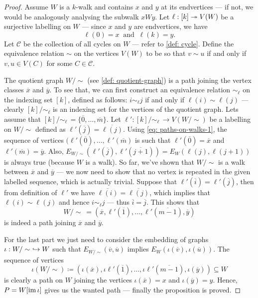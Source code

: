 \begin{proof}
  Assume \(W\) is a \(k\)-walk and contains \(x\) and \(y\) at its endvertices
  --- if not, we would be analogously analysing the subwalk \(xWy\). Let \(\ell:
  [k] \twoheadrightarrow V(W)\) be a surjective labelling on \(W\) --- since \(x\) and \(y\)
  are endvertices, we have
  \begin{equation}\label{eq: paths-on-walks-1}
    \ell(0) = x\ \text{ and }\ \ell(k) = y.
  \end{equation}
  Let \(\mathcal C\) be the
  collection of all cycles on \(W\) --- refer to \cref{def: cycle}. Define the
  equivalence relation \(\sim\) on the vertices \(V(W)\) to be so that \(v \sim
  u\) if and only if \(v, u \in V(C)\) for some \(C \in \mathcal C\).

  The quotient graph \(W/\sim\) (see \cref{def: quotient-graph}) is a path
  joining the vertex classes \(\overline x\) and \(\overline y\). To see that,
  we can first construct an equivalence relation \(\sim_\ell\) on the indexing
  set \([k]\), defined as follows: \(i \sim_\ell j\) if and only if \(\ell(i)
  \sim \ell(j)\) --- clearly \([k]/\sim_\ell\) is an indexing set for the
  vertices of the quotient graph. Lets assume that \([k]/\sim_\ell\, =
  \{\overline 0, \dots, \overline m\}\). Let \(\ell': [k]/\sim_\ell\, \to
  V(W/\sim)\) be a labelling on \(W/\sim\) defined as \(\ell'(\overline j) =
  \overline{\ell(j)}\). Using \cref{eq: paths-on-walks-1}, the sequence of
  vertices \((\ell'(\overline 0), \dots, \ell'(\overline m)\) is such that
  \(\ell'(\overline 0) = \overline x\) and \(\ell'(\overline m) = \overline y\).
  Also, \(E_{W/\sim}(\ell'(\overline j), \ell'(\overline{j + 1})) = E_W(\ell(j),
  \ell(j+1))\) is always true (because \(W\) is a walk). So far, we've shown
  that \(W/\sim\) is a walk between \(\overline x\) and \(\overline y\) --- we
  now need to show that no vertex is repeated in the given labelled sequence,
  which is actually trivial. Suppose that \(\ell'(\overline i) = \ell'(\overline
  j)\), then from definition of \(\ell'\) we have \(\overline{\ell(i)} =
  \overline{\ell(j)}\), which implies that \(\ell(i) \sim \ell(j)\) and hence
  \(i \sim_\ell j\) --- thus \(\overline i = \overline j\). This shows that
  \[
    W/\sim\ = (\overline x, \ell'(\overline 1), \dots, \ell'(\overline{m - 1}),
    \overline y)
  \]
  is indeed a path joining \(\overline x\) and \(\overline y\).

  For the last part we just need to consider the embedding of graphs \(\iota:
  W/\sim\ \hookrightarrow W\) such that \(E_{W/\sim}(\overline v, \overline u)\) implies
  \(E_W(\iota(\overline v), \iota(\overline u))\). The sequence of vertices
  \[
    \iota(W/\sim) \coloneqq (\iota(\overline x), \iota\ell'(\overline 1), \dots,
    \iota \ell'(\overline{m-1}), \iota(\overline y)) \subseteq W
  \]
  is clearly a path on \(W\) joining the vertices \(\iota(\overline x) = x\) and
  \(\iota(\overline y) = y\). Hence, \(P = W[\operatorname{im} \iota]\) gives us the wanted
  path --- finally the proposition is proved.
\end{proof}

